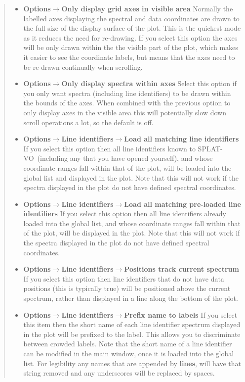 \documentclass[twoside,11pt]{article}
\newcommand{\latexhtml}[2]{#1}
\renewcommand{\_}{\texttt{\symbol{95}}}
\newcommand{\SPLAT}{\textsf{SPLAT-VO}}
\newcommand{\submenuitem}[2]{\latexhtml{\textbf{#1$\rightarrow$#2}}{\textbf{#1->#2}}}
\newcommand{\subsubmenuitem}[3]{\latexhtml{\textbf{#1$\rightarrow$#2$\rightarrow$#3}}{\textbf{#1->#2->#3}}}
\newcommand{\labelitem}[1]{\textbf{#1}}
\begin{document}
\begin{quote}
\begin{itemize}
  \item \submenuitem{Options}{Only display grid axes in visible area}
  Normally the labelled axes displaying the spectral and data coordinates are
  drawn to the full size of the display surface of the plot. This is the
  quickest mode as it reduces the need for re-drawing. If you select this
  option the axes will be only drawn within the the visible part of the plot,
  which makes it easier to see the coordinate labels, but means that the axes
  need to be re-drawn continually when scrolling.

  \item \submenuitem{Options}{Only display spectra within axes}
  Select this option if you only want spectra (including line identifiers) to
  be drawn within the bounds of the axes. When combined with the previous
  option to only display axes in the visible area this will potentially slow
  down scroll operations a lot, so the default is off.

  \item \subsubmenuitem{Options}{Line identifiers}{Load all matching line identifiers}
  If you select this option then all line identifiers known to \SPLAT\
  (including any that you have opened yourself), and whose coordinate ranges
  fall within that of the plot, will be loaded into the global list and
  displayed in the plot. Note that this will not work if the spectra displayed
  in the plot do not have defined spectral coordinates.

  \item \subsubmenuitem{Options}{Line identifiers}{Load all matching pre-loaded line identifiers}
  If you select this option then all line identifiers already loaded into the
  global list, and whose coordinate ranges fall within that of the plot, will
  be displayed in the plot. Note that this will not work if the spectra
  displayed in the plot do not have defined spectral coordinates.

  \item \subsubmenuitem{Options}{Line identifiers}{Positions track current spectrum}
  If you select this option then line identifiers that do not have data
  positions (this is typically true) will be positioned above the current
  spectrum, rather than displayed in a line along the bottom of the plot.

  \item \subsubmenuitem{Options}{Line identifiers}{Prefix name to labels}
  If you select this item then the short name of each line identifier spectrum
  displayed in the plot will be prefixed to the label. This allows you to
  discriminate between crowded labels. Note that the short name of a line
  identifier can be modified in the main window, once it is loaded into the
  global list. For legibility any names that are appended by
  \labelitem{\_lines}, will have that string removed and any underscores will
  be replaced by spaces.


\end{itemize}
\end{quote}
\end{document}
